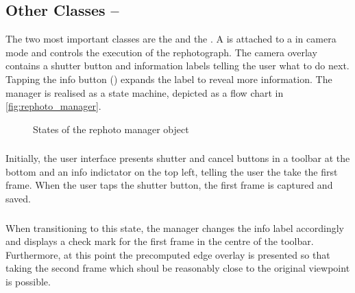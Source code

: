 \subsection{Other Classes -- }

The two most important classes are the  and the
. A  is attached to
a  in camera mode and controls the execution of
the rephotograph. The camera overlay contains a shutter button and information
labels telling the user what to do next. Tapping the info button
() expands the label
to reveal more information. The manager is realised as a state machine, depicted
as a flow chart in \autoref{fig:rephoto_manager}.

\begin{figure}[h]
   {\centering      
      
      \caption{States of the rephoto manager object}
   \label{fig:rephoto_manager}}
\end{figure}

\subsubsection*{}

Initially, the user interface presents shutter and cancel buttons in a toolbar
at the bottom and an info indictator on the top left, telling the user the take
the first frame. When the user taps the shutter button, the first frame is
captured and saved.

\subsubsection*{}

When transitioning to this state, the manager changes the info label accordingly
and displays a check mark for the first frame in the centre of the toolbar.
Furthermore, at this point the precomputed edge overlay is presented so that
taking the second frame which shoul be reasonably close to the original
viewpoint is possible.

\subsubsection*{}

